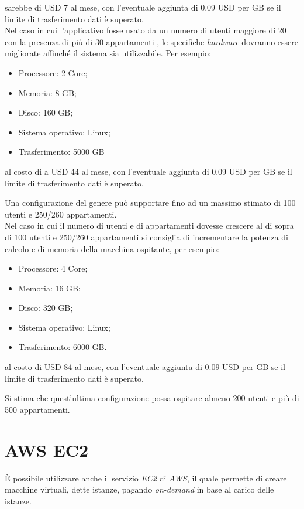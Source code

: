 \documentclass[10pt, letterpaper]{article}
\begin{document}
sarebbe di USD 7 al mese, con l'eventuale aggiunta di 0.09 USD per GB se il limite di trasferimento dati è superato.\\

Nel caso in cui l'applicativo fosse usato da un numero di utenti maggiore di 20 con la presenza di più di 30 appartamenti , le specifiche \textit{hardware} dovranno essere migliorate affinché il sistema sia utilizzabile.
Per esempio: 

\begin{itemize}
    \item Processore: 2 Core;
    \item Memoria: 8 GB;
    \item Disco: 160 GB;
    \item Sistema operativo: Linux;
    \item Trasferimento: 5000 GB
\end{itemize}

al costo di a USD 44 al mese, con l'eventuale aggiunta di 0.09 USD per GB se il limite di trasferimento dati è superato.

Una configurazione del genere può supportare fino ad un massimo stimato di 100 utenti e 250/260 appartamenti.\\

Nel caso in cui il numero di utenti e di appartamenti dovesse crescere al di sopra di 100 utenti e 250/260 appartamenti si consiglia di incrementare la potenza di calcolo e di memoria della macchina ospitante, per esempio: 
\begin{itemize}
    \item Processore: 4 Core;
    \item Memoria: 16 GB;
    \item Disco: 320 GB;
    \item Sistema operativo: Linux;
    \item Trasferimento: 6000 GB.
\end{itemize}

al costo di USD 84 al mese, con l'eventuale aggiunta di  0.09 USD per GB se il limite di trasferimento dati è superato.

Si stima che quest'ultima configurazione possa ospitare almeno 200 utenti e più di 500 appartamenti.

\section{AWS EC2}
È possibile utilizzare anche il servizio \textit{EC2} di \textit{AWS}, il quale permette di creare macchine virtuali, dette istanze, pagando \textit{on-demand} in base al carico delle istanze.
\end{document}
